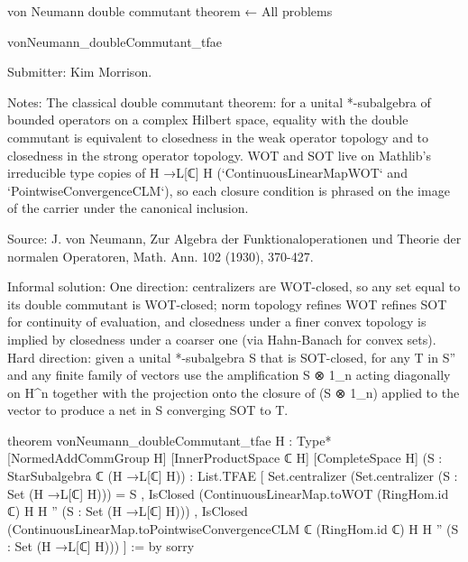 von Neumann double commutant theorem
← All problems

vonNeumann_doubleCommutant_tfae

Submitter: Kim Morrison.

Notes: The classical double commutant theorem: for a unital *-subalgebra of bounded operators on a complex Hilbert space, equality with the double commutant is equivalent to closedness in the weak operator topology and to closedness in the strong operator topology. WOT and SOT live on Mathlib's irreducible type copies of H →L[ℂ] H (`ContinuousLinearMapWOT` and `PointwiseConvergenceCLM`), so each closure condition is phrased on the image of the carrier under the canonical inclusion.

Source: J. von Neumann, Zur Algebra der Funktionaloperationen und Theorie der normalen Operatoren, Math. Ann. 102 (1930), 370-427.

Informal solution: One direction: centralizers are WOT-closed, so any set equal to its double commutant is WOT-closed; norm topology refines WOT refines SOT for continuity of evaluation, and closedness under a finer convex topology is implied by closedness under a coarser one (via Hahn-Banach for convex sets). Hard direction: given a unital *-subalgebra S that is SOT-closed, for any T in S'' and any finite family of vectors use the amplification S ⊗ 1_n acting diagonally on H^n together with the projection onto the closure of (S ⊗ 1_n) applied to the vector to produce a net in S converging SOT to T.

theorem vonNeumann_doubleCommutant_tfae {H : Type*} [NormedAddCommGroup H] [InnerProductSpace ℂ H] [CompleteSpace H]
    (S : StarSubalgebra ℂ (H →L[ℂ] H)) :
    List.TFAE
      [ Set.centralizer (Set.centralizer (S : Set (H →L[ℂ] H))) = S
      , IsClosed
          (ContinuousLinearMap.toWOT (RingHom.id ℂ) H H '' (S : Set (H →L[ℂ] H)))
      , IsClosed
          (ContinuousLinearMap.toPointwiseConvergenceCLM ℂ (RingHom.id ℂ) H H ''
            (S : Set (H →L[ℂ] H))) ] := by
  sorry
